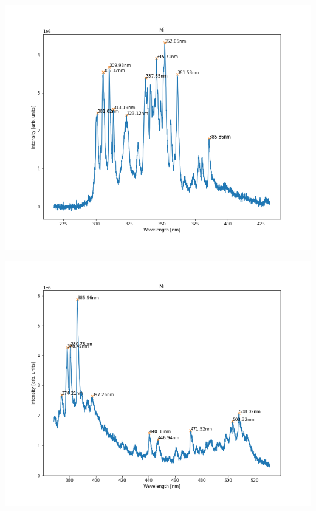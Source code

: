 \documentclass{beamer}
\begin{document}
\begin{frame}
    \includegraphics[scale=0.45]{Ni/Ni_350.png}
\end{frame}

\begin{frame}
    \includegraphics[scale=0.45]{Ni/Ni_450.png}
\end{frame}
\end{document}
